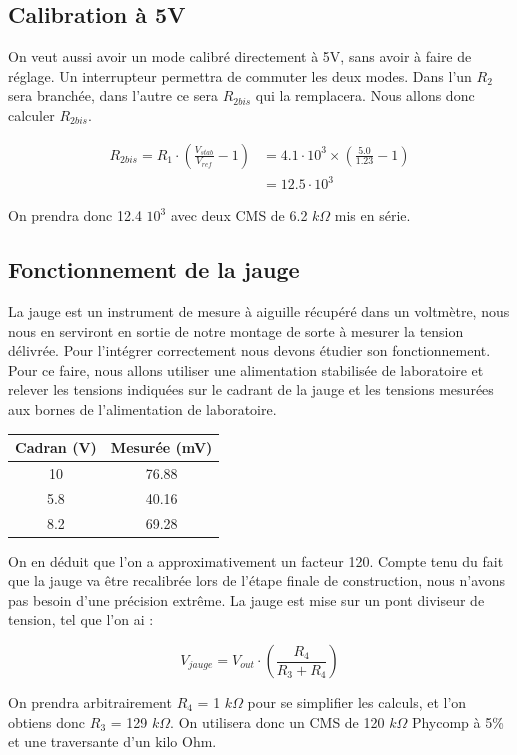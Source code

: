 \documentclass[12pt]{article}
\begin{document}
\subsection{Calibration à 5V}

On veut aussi avoir un mode calibré directement à 5V, sans avoir à faire de réglage. Un interrupteur permettra de
commuter les deux modes. Dans l'un  $R_2$ sera branchée, dans l'autre ce sera $R_{2bis}$ qui la remplacera. Nous
allons donc calculer $R_{2bis}$.

\begin{equation}
	\begin{split}
		R_{2bis} = R_1 \cdot ( \frac{V_{stab}}{V_{ref}} - 1)& = 4.1 \cdot 10^3 \times (\frac{5.0}{1.23} - 1) \\
									& = 12.5 \cdot 10^3
	\end{split}
\end{equation}

On prendra donc 12.4 $10^3$ avec deux CMS de 6.2 $k\Omega$ mis en série.


\subsection{Fonctionnement de la jauge}

La jauge est un instrument de mesure à aiguille récupéré dans un voltmètre, nous nous en serviront en sortie de notre 
montage de sorte à mesurer la tension délivrée. Pour l'intégrer correctement nous devons étudier son fonctionnement.
Pour ce faire, nous allons utiliser une alimentation stabilisée de laboratoire et relever les tensions indiquées 
sur le cadrant de la jauge et les tensions mesurées aux bornes de l'alimentation de laboratoire.

\begin{center}
	\begin{tabular}{|c|c|}
		\hline
		Cadran (V)	& Mesurée (mV) \\ \hline
		10		& 76.88		\\
		5.8		& 40.16		\\
		8.2		& 69.28		\\
		\hline
	\end{tabular}
\end{center}

On en déduit que l'on a approximativement un facteur 120. Compte tenu du fait que la jauge va être recalibrée lors
de l'étape finale de construction, nous n'avons pas besoin d'une précision extrême. La jauge est mise sur un pont diviseur
de tension, tel que l'on ai :

\begin{equation}
	\boxed{V_{jauge} = V_{out} \cdot ( \frac{R_4}{R_3 + R_4} )}
\end{equation}

On prendra arbitrairement $R_4$ = 1 $k\Omega$ pour se simplifier les calculs, et l'on obtiens donc $R_3$ = 129 $k\Omega$.
On utilisera donc un CMS de 120 $k\Omega$ Phycomp à 5\% et une traversante d'un kilo Ohm.
\end{document}
